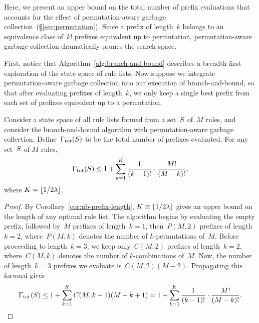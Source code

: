 Here, we present an upper bound on the total number of prefix
evaluations that accounts for the effect of permutation-aware
garbage collection~(\S\ref{sec:permutation}).
%
Since a prefix of length~$k$ belongs to an equivalence class of~$k!$
prefixes equivalent up to permutation, permutation-aware garbage
collection dramatically prunes the search space.

First, notice that Algorithm~\ref{alg:branch-and-bound} describes a
breadth-first exploration of the state space of rule lists.
%
Now suppose we integrate permutation-aware garbage collection into
our execution of branch-and-bound, so that after evaluating
prefixes of length~$k$, we only keep a single best prefix
from each set of prefixes equivalent up to a permutation.

\begin{theorem}
%
Consider a state space of all rule lists formed from a set~$S$
of~$M$ rules, and consider the branch-and-bound algorithm with
permutation-aware garbage collection.
%
Define~${\Gamma_{\textnormal{tot}}}(S)$ to be the total number of prefixes evaluated.
%
For any set~$S$ of $M$ rules,
\begin{align}
\TotalRemaining(\RuleSet)
\le  1 + \sum_{k=1}^K \frac{1}{(k - 1)!} \cdot \frac{M!}{(M - k)!},
\label{eq:size-naive}
\end{align}
where ${K = \lfloor 1 / 2 {\lambda} \rfloor}$.
\end{theorem}

\begin{proof}
By Corollary~\ref{cor:ub-prefix-length},
${K \equiv \lfloor 1 / 2 {\lambda} \rfloor}$
gives an upper bound on the length of any optimal rule list.
%
The algorithm begins by evaluating the empty prefix,
followed by~$M$ prefixes of length~${k=1}$,
then~${P(M, 2)}$ prefixes of length~${k=2}$,
where~${P(M, k)}$ denotes the number of $k$-permutations of~$M$.
%
Before proceeding to length~${k=3}$, we keep only~${C(M, 2)}$
prefixes of length~${k=2}$, where~${C(M, k)}$ denotes the
number of $k$-combinations of~$M$.
%
Now, the number of length~${k=3}$ prefixes we evaluate is~${C(M, 2) (M - 2)}$.
%
Propagating this forward gives
\begin{align}
\TotalRemaining(\RuleSet) \le 1 + \sum_{k=1}^K C(M, k-1) (M - k + 1)
= 1 + \sum_{k=1}^K \frac{1}{(k - 1)!} \cdot \frac{M!}{(M - k)!}.
\end{align}
\end{proof}

